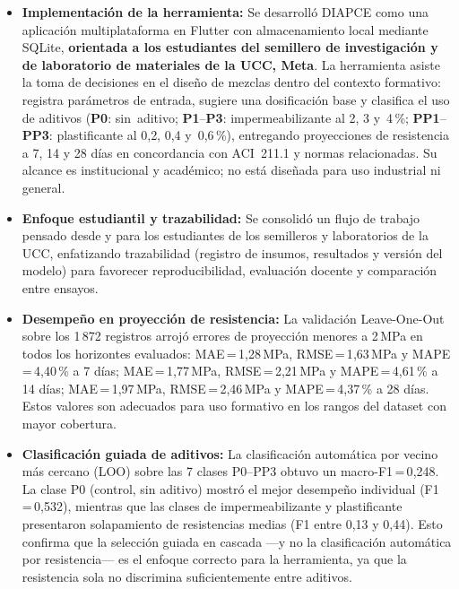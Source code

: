 \begin{itemize}
  \item \textbf{Implementación de la herramienta:} Se desarrolló DIAPCE como una aplicación multiplataforma en Flutter con almacenamiento local mediante SQLite, \textbf{orientada a los estudiantes del semillero de investigación y de laboratorio de materiales de la UCC, Meta}. La herramienta asiste la toma de decisiones en el diseño de mezclas dentro del contexto formativo: registra parámetros de entrada, sugiere una dosificación base y clasifica el uso de aditivos (\textbf{P0}: sin~aditivo; \textbf{P1}--\textbf{P3}: impermeabilizante al 2, 3 y~4\,\%; \textbf{PP1}--\textbf{PP3}: plastificante al 0{,}2, 0{,}4 y~0{,}6\,\%), entregando proyecciones de resistencia a 7, 14 y 28 días en concordancia con ACI~211.1 y normas relacionadas. Su alcance es institucional y académico; no está diseñada para uso industrial ni general.

  \item \textbf{Enfoque estudiantil y trazabilidad:} Se consolidó un flujo de trabajo pensado desde y para los estudiantes de los semilleros y laboratorios de la UCC, enfatizando trazabilidad (registro de insumos, resultados y versión del modelo) para favorecer reproducibilidad, evaluación docente y comparación entre ensayos.

  \item \textbf{Desempeño en proyección de resistencia:} La validación Leave-One-Out sobre los 1\,872 registros arrojó errores de proyección menores a 2\,MPa en todos los horizontes evaluados: MAE\,=\,1{,}28\,MPa, RMSE\,=\,1{,}63\,MPa y MAPE\,=\,4{,}40\,\% a 7 días; MAE\,=\,1{,}77\,MPa, RMSE\,=\,2{,}21\,MPa y MAPE\,=\,4{,}61\,\% a 14 días; MAE\,=\,1{,}97\,MPa, RMSE\,=\,2{,}46\,MPa y MAPE\,=\,4{,}37\,\% a 28 días. Estos valores son adecuados para uso formativo en los rangos del dataset con mayor cobertura.

  \item \textbf{Clasificación guiada de aditivos:} La clasificación automática por vecino más cercano (LOO) sobre las 7 clases P0--PP3 obtuvo un macro-F1\,=\,0{,}248. La clase P0 (control, sin aditivo) mostró el mejor desempeño individual (F1\,=\,0{,}532), mientras que las clases de impermeabilizante y plastificante presentaron solapamiento de resistencias medias (F1 entre 0{,}13 y 0{,}44). Esto confirma que la selección guiada en cascada ---y no la clasificación automática por resistencia--- es el enfoque correcto para la herramienta, ya que la resistencia sola no discrimina suficientemente entre aditivos.


\end{itemize}
